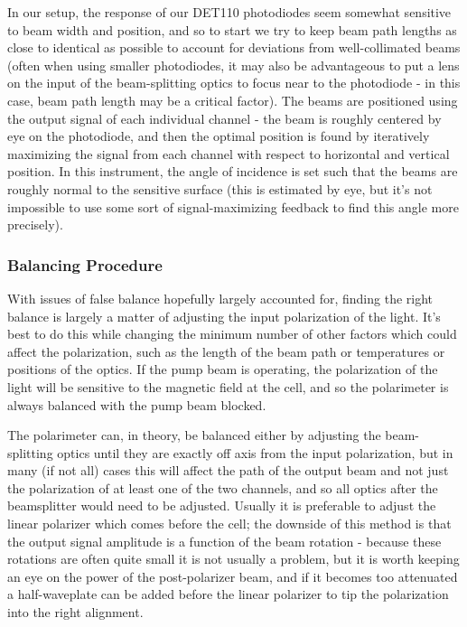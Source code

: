 \documentclass[PaulGanssle-Thesis.tex]{subfiles}
\begin{document}
In our setup, the response of our DET110 photodiodes seem somewhat sensitive to beam width and position, and so to start we try to keep beam path lengths as close to identical as possible to account for deviations from well-collimated beams (often when using smaller photodiodes, it may also be advantageous to put a lens on the input of the beam-splitting optics to focus near to the photodiode - in this case, beam path length may be a critical factor). The beams are positioned using the output signal of each individual channel - the beam is roughly centered by eye on the photodiode, and then the optimal position is found by iteratively maximizing the signal from each channel with respect to horizontal and vertical position. In this instrument, the angle of incidence is set such that the beams are roughly normal to the sensitive surface (this is estimated by eye, but it's not impossible to use some sort of signal-maximizing feedback to find this angle more precisely).

\subsubsection{Balancing Procedure}
\label{mag.design.polarimeter.balancing}
With issues of false balance hopefully largely accounted for, finding the right balance is largely a matter of adjusting the input polarization of the light. It's best to do this while changing the minimum number of other factors which could affect the polarization, such as the length of the beam path or temperatures or positions of the optics. If the pump beam is operating, the polarization of the light will be sensitive to the magnetic field at the cell, and so the polarimeter is always balanced with the pump beam blocked.

The polarimeter can, in theory, be balanced either by adjusting the beam-splitting optics until they are exactly \unit[45]{\degsym} off axis from the input polarization, but in many (if not all) cases this will affect the path of the output beam and not just the polarization of at least one of the two channels, and so all optics after the beamsplitter would need to be adjusted. Usually it is preferable to adjust the linear polarizer which comes before the cell; the downside of this  method is that the output signal amplitude is a function of the beam rotation - because these rotations are often quite small it is not usually a problem, but it is worth keeping an eye on the power of the post-polarizer beam, and if it becomes too attenuated a half-waveplate can be added before the linear polarizer to tip the polarization into the right alignment.\cite{Wu1986}
\end{document}

